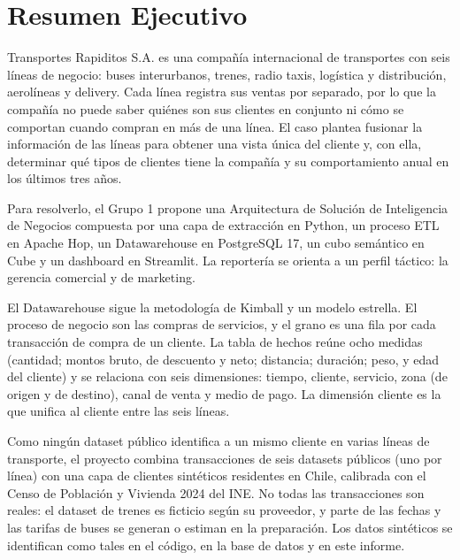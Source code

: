 \section*{Resumen Ejecutivo}
{}

Transportes Rapiditos S.A. es una compañía internacional de transportes con
seis líneas de negocio: buses interurbanos, trenes, radio taxis, logística y
distribución, aerolíneas y delivery. Cada línea registra sus ventas por
separado, por lo que la compañía no puede saber quiénes son sus clientes en
conjunto ni cómo se comportan cuando compran en más de una línea. El caso
plantea fusionar la información de las líneas para obtener una vista única del
cliente y, con ella, determinar qué tipos de clientes tiene la compañía y su
comportamiento anual en los últimos tres años.

Para resolverlo, el Grupo 1 propone una Arquitectura de Solución de
Inteligencia de Negocios compuesta por una capa de extracción en Python, un
proceso ETL en Apache Hop, un Datawarehouse en PostgreSQL 17, un cubo
semántico en Cube y un dashboard en Streamlit. La reportería se orienta a un
perfil táctico: la gerencia comercial y de marketing.

El Datawarehouse sigue la metodología de Kimball y un modelo estrella. El
proceso de negocio son las compras de servicios, y el grano es una fila por
cada transacción de compra de un cliente. La tabla de hechos
 reúne ocho medidas (cantidad; montos bruto, de descuento y
neto; distancia; duración; peso, y edad del cliente) y se relaciona con seis
dimensiones: tiempo, cliente, servicio, zona (de origen y de
destino), canal de venta y medio de pago. La dimensión cliente es la que
unifica al cliente entre las seis líneas.

Como ningún dataset público identifica a un mismo cliente en varias líneas de
transporte, el proyecto combina transacciones de seis datasets públicos (uno
por línea) con una capa de clientes sintéticos residentes en Chile,
calibrada con el Censo de Población y Vivienda 2024 del INE. No todas las
transacciones son reales: el dataset de trenes es ficticio según su proveedor,
y parte de las fechas y las tarifas de buses se generan o estiman en la
preparación. Los datos sintéticos se identifican como tales en el código, en
la base de datos y en este informe.

